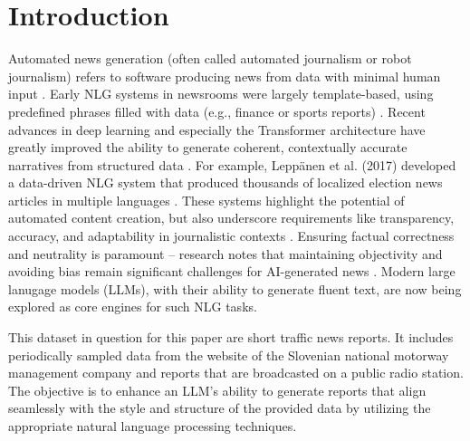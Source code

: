 \section*{Introduction}

Automated news generation (often called automated journalism or robot journalism) refers to software producing news from data with minimal human input \cite{acl_anthology}.
Early NLG systems in newsrooms were largely template-based, using predefined phrases filled with data (e.g., finance or sports reports) \cite{acl_anthology}.
Recent advances in deep learning and especially the Transformer architecture have greatly improved the ability to generate coherent, contextually accurate narratives from structured data \cite{arxiv_transformer}.
For example, Leppänen et al. (2017) developed a data-driven NLG system that produced thousands of localized election news articles in multiple languages \cite{acl_anthology}.
These systems highlight the potential of automated content creation, but also underscore requirements like transparency, accuracy, and adaptability in journalistic contexts \cite{acl_anthology}.
Ensuring factual correctness and neutrality is paramount – research notes that maintaining objectivity and avoiding bias remain significant challenges for AI-generated news \cite{arxiv_bias}.
Modern large lanugage models (LLMs), with their ability to generate fluent text, are now being explored as core engines for such NLG tasks.

This dataset in question for this paper are short traffic news reports.
It includes periodically sampled data from the website of the Slovenian national motorway management company and reports that are broadcasted on a public radio station.
The objective is to enhance an LLM's ability to generate reports that align seamlessly with the style and structure of the provided data by utilizing the appropriate natural language processing techniques.

